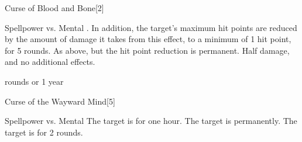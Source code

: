 \begin{spellsection}{Curse of Blood and Bone}[2]
    \begin{spellheader}
    \end{spellheader}
    \begin{spellcontent}
        \begin{spelltargetinginfo}
        \end{spelltargetinginfo}
        \begin{spelleffects}
            \begin{spellattack}{Spellpower vs. Mental}
                \spellsuccess {}. In addition, the target's maximum hit points are reduced by the amount of damage it takes from this effect, to a minimum of 1 hit point, for 5 rounds.
                \spellcritical As above, but the hit point reduction is permanent.
                \spellfailure Half damage, and no additional effects.
            \end{spellattack}
             rounds or 1 year
        \end{spelleffects}
    \end{spellcontent}
    \begin{spellfooter}
        \spellnotes \cursespellnotes
        \miscastrandom
    \end{spellfooter}
\end{spellsection}

\begin{spellsection}{Curse of the Wayward Mind}[5]
    \begin{spellheader}
    \end{spellheader}
    \begin{spellcontent}
        \begin{spelltargetinginfo}
        \end{spelltargetinginfo}
        \begin{spelleffects}
            \begin{spellattack}{Spellpower vs. Mental}
                \spellsuccess The target is \disoriented for one hour.
                \spellcritical The target is \disoriented permanently.
                \spellfailure The target is \disoriented for 2 rounds.
            \end{spellattack}
        \end{spelleffects}
    \end{spellcontent}
    \begin{spellfooter}
        \spellnotes \cursespellnotes
        \miscastrandom
    \end{spellfooter}
\end{spellsection}

